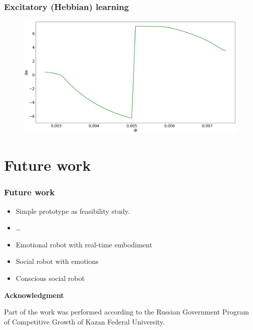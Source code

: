 \documentclass[12pt, aspectratio=169]{beamer}
\begin{document}

\begin{frame}
\frametitle{Excitatory (Hebbian) learning}
\begin{figure}
\includegraphics[width=0.9\linewidth]{result_hebb}
\end{figure}
\end{frame}

\section{Future work}
\begin{frame}
  \frametitle{Future work}
  
\begin{itemize}
  \item Simple prototype as feasibility study.
  \item \ldots\
  \item Emotional robot with real-time embodiment
  \item Social robot with emotions
  \item Conscious social robot
\end{itemize}

\textbf{Acknowledgment}

Part of the work was performed according to the Russian Government Program of Competitive Growth of Kazan Federal University.


\end{frame}


\end{document}

